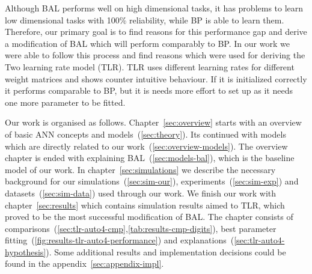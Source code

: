 

Although BAL performs well on high dimensional tasks, it has problems to learn low dimensional tasks with 100\% reliability, while BP is able to learn them. Therefore, our primary goal is to find reasons for this performance gap and derive a modification of BAL which will perform comparably to BP. In our work we were able to follow this process and find reasons which were used for deriving the Two learning rate model (TLR). TLR uses different learning rates for different weight matrices and shows counter intuitive behaviour. If it is initialized correctly it performs comparable to BP, but it is needs more effort to set up as it needs one more parameter to be fitted. 


Our work is organised as follows. Chapter~\ref{sec:overview} starts with an overview of basic ANN concepts and models~(\ref{sec:theory}). Its continued with models which are directly related to our work~(\ref{sec:overview-models}). The overview chapter is ended with explaining BAL~(\ref{sec:models-bal}), which is the baseline model of our work. In chapter~\ref{sec:simulations} we describe the necessary background for our simulations~(\ref{sec:sim-our}), experiments~(\ref{sec:sim-exp}) and datasets~(\ref{sec:sim-data}) used through our work. We finish our work with chapter~\ref{sec:results} which contains simulation results aimed to TLR, which proved to be the most successful modification of BAL. The chapter consists of comparisons~(\ref{sec:tlr-auto4-cmp},\ref{tab:results-cmp-digits}), best parameter fitting~(\ref{fig:results-tlr-auto4-performance}) and explanations~(\ref{sec:tlr-auto4-hypothesis}). Some additional results and implementation decisions could be found in the appendix~\ref{sec:appendix-impl}.  





